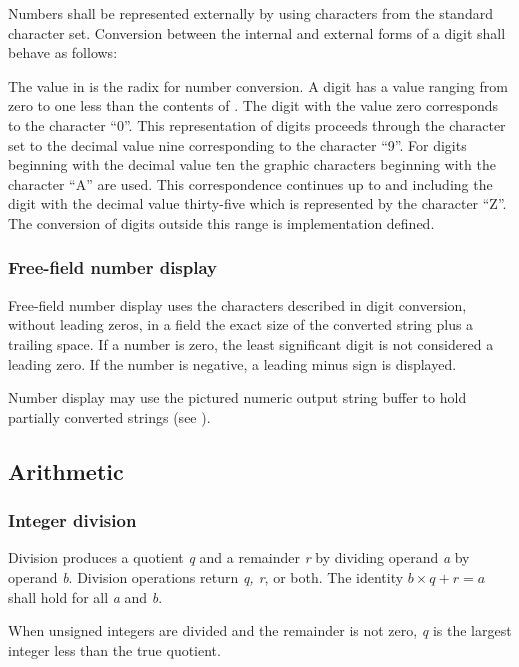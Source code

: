 Numbers shall be represented externally by using characters from
the standard character set. Conversion between the internal and
external forms of a digit shall behave as follows:

The value in  is the radix for number conversion. A
digit has a value ranging from zero to one less than the contents
of . The digit with the value zero corresponds to the
character ``0''. This representation of digits proceeds through
the character set to the decimal value nine corresponding to the
character ``9''. For digits beginning with the decimal value ten
the graphic characters beginning with the character ``A'' are used.
This correspondence continues up to and including the digit with
the decimal value thirty-five which is represented by the character
``Z''. The conversion of digits outside this range is implementation
defined.

\subsubsection{Free-field number display} %
\label{usage:dot}

Free-field number display uses the characters described in digit
conversion, without leading zeros, in a field the exact size of
the converted string plus a trailing space. If a number is zero,
the least significant digit is not considered a leading zero. If
the number is negative, a leading minus sign is displayed.

Number display may use the pictured numeric output string buffer
to hold partially converted strings (see ).

\subsection{Arithmetic} %

\subsubsection{Integer division} %
\label{usage:div}

Division produces a quotient \emph{q} and a remainder \emph{r}
by dividing operand \emph{a} by operand \emph{b}. Division
operations return \emph{q, r}, or both. The identity
$b \times q + r = a$ shall hold for all \emph{a} and \emph{b}.

When unsigned integers are divided and the remainder is not zero,
\emph{q} is the largest integer less than the true quotient.

